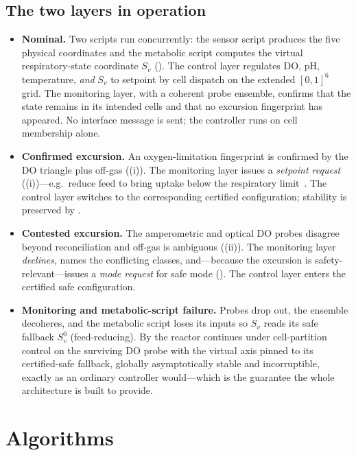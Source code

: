 \documentclass[11pt,a4paper,twocolumn]{article}
\theoremstyle{thmstyle}
\theoremstyle{definition}
\theoremstyle{remark}
\begin{document}
\subsection{The two layers in operation}

\begin{itemize}[leftmargin=1.2em,itemsep=2pt]
\item \textbf{Nominal.} Two scripts run concurrently: the sensor script
produces the five physical coordinates and the metabolic script computes
the virtual respiratory-state coordinate $S_v$
(). The control layer regulates DO, pH,
temperature, \emph{and} $S_v$ to setpoint by cell dispatch on the extended
$[0,1]^6$ grid. The monitoring layer, with a coherent probe ensemble,
confirms that the state remains in its intended cells and that no
excursion fingerprint has appeared. No interface message is sent; the
controller runs on cell membership alone.
\item \textbf{Confirmed excursion.} An oxygen-limitation fingerprint is
confirmed by the DO triangle plus off-gas ((i)). The
monitoring layer issues a \emph{setpoint request}
((i))---e.g.\ reduce feed to bring uptake below the
respiratory limit~\citep{sonnleitner1986growth}. The control layer
switches to the corresponding certified configuration; stability is
preserved by .
\item \textbf{Contested excursion.} The amperometric and optical DO probes
disagree beyond reconciliation and off-gas is ambiguous
((ii)). The monitoring layer \emph{declines}, names the
conflicting classes, and---because the excursion is safety-relevant---issues
a \emph{mode request} for safe mode (). The control
layer enters the certified safe configuration.
\item \textbf{Monitoring and metabolic-script failure.} Probes drop out,
the ensemble decoheres, and the metabolic script loses its inputs so $S_v$
reads its safe fallback $S_v^{0}$ (feed-reducing). By
 the reactor continues under cell-partition control on
the surviving DO probe with the virtual axis pinned to its
certified-safe fallback, globally asymptotically stable and incorruptible,
exactly as an ordinary controller would---which is the guarantee the whole
architecture is built to provide.
\end{itemize}

\section{Algorithms}
\label{sec:algorithms}
\end{document}
